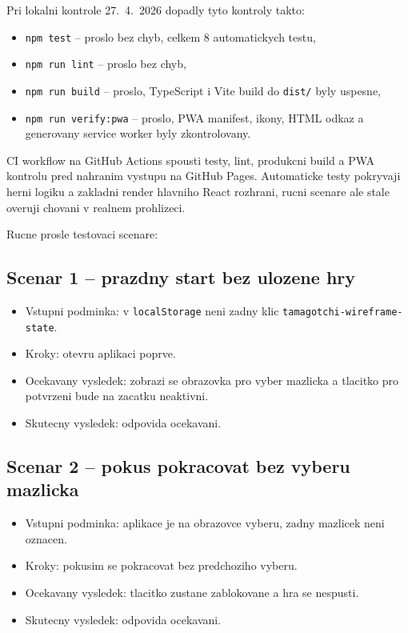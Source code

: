 \documentclass[12pt,a4paper]{article}
\begin{document}
Pri lokalni kontrole 27.~4.~2026 dopadly tyto kontroly takto:
\begin{itemize}[leftmargin=2em]
  \item \texttt{npm test} -- proslo bez chyb, celkem 8 automatickych testu,
  \item \texttt{npm run lint} -- proslo bez chyb,
  \item \texttt{npm run build} -- proslo, TypeScript i Vite build do \texttt{dist/} byly uspesne,
  \item \texttt{npm run verify:pwa} -- proslo, PWA manifest, ikony, HTML odkaz a generovany service worker byly zkontrolovany.
\end{itemize}

CI workflow na GitHub Actions spousti testy, lint, produkcni build a PWA kontrolu pred nahranim vystupu na GitHub Pages. Automaticke testy pokryvaji herni logiku a zakladni render hlavniho React rozhrani, rucni scenare ale stale overuji chovani v realnem prohlizeci.

Rucne prosle testovaci scenare:

\subsection*{Scenar 1 -- prazdny start bez ulozene hry}
\begin{itemize}[leftmargin=2em]
  \item Vstupni podminka: v \texttt{localStorage} neni zadny klic \texttt{tamagotchi-wireframe-state}.
  \item Kroky: otevru aplikaci poprve.
  \item Ocekavany vysledek: zobrazi se obrazovka pro vyber mazlicka a tlacitko pro potvrzeni bude na zacatku neaktivni.
  \item Skutecny vysledek: odpovida ocekavani.
\end{itemize}

\subsection*{Scenar 2 -- pokus pokracovat bez vyberu mazlicka}
\begin{itemize}[leftmargin=2em]
  \item Vstupni podminka: aplikace je na obrazovce vyberu, zadny mazlicek neni oznacen.
  \item Kroky: pokusim se pokracovat bez predchoziho vyberu.
  \item Ocekavany vysledek: tlacitko  zustane zablokovane a hra se nespusti.
  \item Skutecny vysledek: odpovida ocekavani.
\end{itemize}
\end{document}
